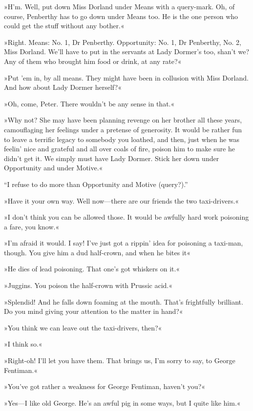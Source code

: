 »H'm. Well, put down Miss Dorland under Means with a query-mark. Oh, of course, Penberthy has to go down under Means too. He is the one person who could get the stuff without any bother.«

»Right. Means: No. 1, Dr Penberthy. Opportunity: No. 1, Dr Penberthy, No. 2, Miss Dorland. We'll have to put in the servants at Lady Dormer's too, shan't we? Any of them who brought him food or drink, at any rate?«

»Put 'em in, by all means. They might have been in collusion with Miss Dorland. And how about Lady Dormer herself?«

»Oh, come, Peter. There wouldn't be any sense in that.«

»Why not? She may have been planning revenge on her brother all these years, camouflaging her feelings under a pretense of generosity. It would be rather fun to leave a terrific legacy to somebody you loathed, and then, just when he was feelin' nice and grateful and all over coals of fire, poison him to make sure he didn't get it. We simply must have Lady Dormer. Stick her down under Opportunity and under Motive.«

\enquote{I refuse to do more than Opportunity and Motive (query?).}

»Have it your own way. Well now\allowbreak---\allowbreak there are our friends the two taxi-drivers.«

»I don't think you can be allowed those. It would be awfully hard work poisoning a fare, you know.«

»I'm afraid it would. I say! I've just got a rippin' idea for poisoning a taxi-man, though. You give him a dud half-crown, and when he bites it\longdash«

»He dies of lead poisoning. That one's got whiskers on it.«

»Juggins. You poison the half-crown with Prussic acid.«

»Splendid! And he falls down foaming at the mouth. That's frightfully brilliant. Do you mind giving your attention to the matter in hand?«

»You think we can leave out the taxi-drivers, then?«

»I think so.«

»Right-oh! I'll let you have them. That brings us, I'm sorry to say, to George Fentiman.«

»You've got rather a weakness for George Fentiman, haven't you?«

»Yes\allowbreak---\allowbreak I like old George. He's an awful pig in some ways, but I quite like him.«

